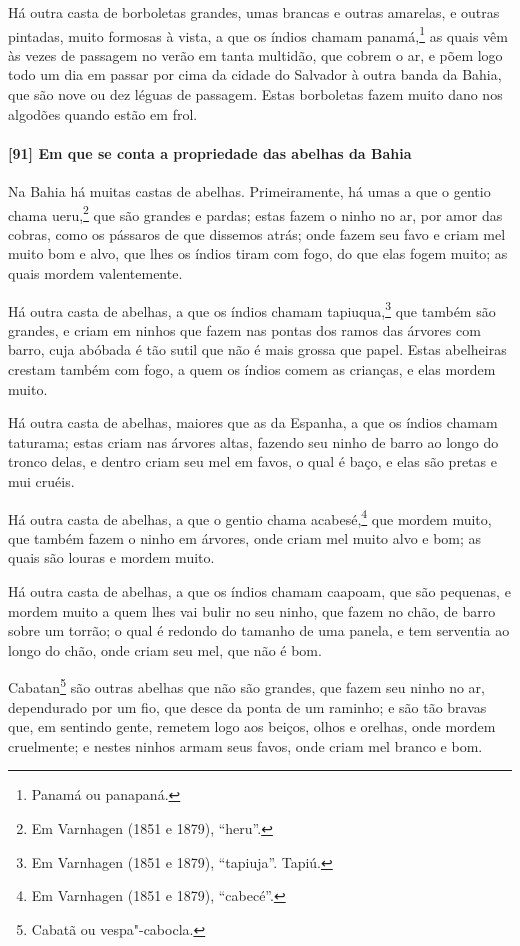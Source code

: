 \begin{linenumbers}
Há outra casta de borboletas grandes, umas brancas e outras amarelas, e outras pintadas,
muito formosas à vista, a que os índios chamam panamá,\footnote{ Panamá ou panapaná.} as
quais vêm às vezes de passagem no verão em tanta multidão, que cobrem o ar, e põem logo
todo um dia em passar por cima da cidade do Salvador à outra banda da Bahia, que são nove
ou dez léguas de passagem. Estas borboletas fazem muito dano nos algodões quando estão em
frol.

\paragraph{[91] Em que se conta a propriedade das abelhas da Bahia}\quad
Na Bahia há muitas castas de abelhas. Primeiramente, há umas a que o gentio chama
ueru,\footnote{ Em Varnhagen (1851 e 1879), ``heru''.} que são grandes e pardas; estas
fazem o ninho no ar, por amor das cobras, como os pássaros de que dissemos atrás; onde
fazem seu favo e criam mel muito bom e alvo, que lhes os índios tiram com fogo, do que
elas fogem muito; as quais mordem valentemente.

Há outra casta de abelhas, a que os índios chamam tapiuqua,\footnote{ Em Varnhagen (1851 e
1879), ``tapiuja''. Tapiú.} que também são grandes, e criam em ninhos que fazem nas
pontas dos ramos das árvores com barro, cuja abóbada é tão sutil que não é mais grossa que
papel. Estas abelheiras crestam também com fogo, a quem os índios comem as crianças, e
elas mordem muito.

Há outra casta de abelhas, maiores que as da Espanha, a que os índios chamam taturama;
estas criam nas árvores altas, fazendo seu ninho de barro ao longo do tronco delas, e
dentro criam seu mel em favos, o qual é baço, e elas são pretas e mui cruéis.

Há outra casta de abelhas, a que o gentio chama acabesé,\footnote{ Em Varnhagen (1851 e
1879), ``cabecé''.} que mordem muito, que também fazem o ninho em árvores, onde criam mel
muito alvo e bom; as quais são louras e mordem muito.

Há outra casta de abelhas, a que os índios chamam caapoam, que são pequenas, e mordem
muito a quem lhes vai bulir no seu ninho, que fazem no chão, de barro sobre um torrão; o
qual é redondo do tamanho de uma panela, e tem serventia ao longo do chão, onde criam seu
mel, que não é bom.

Cabatan\footnote{ Cabatã ou vespa"-cabocla.} são outras abelhas que não são grandes, que
fazem seu ninho no ar, dependurado por um fio, que desce da ponta de um raminho; e são tão
bravas que, em sentindo gente, remetem logo aos beiços, olhos e orelhas, onde mordem
cruelmente; e nestes ninhos armam seus favos, onde criam mel branco e bom.


\end{linenumbers}
